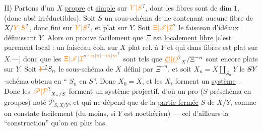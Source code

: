 II) Partons d’un $X$ \uline{propre} et \uline{simple} sur ${\unsure{Y|S}}$, dont les fibres sont de dim $1$,  {} (donc abs! irréductibles). Soit $S$ un sous-schéma  de  ne contenant aucune fibre de $X/{\unsure{Y|S}}$, donc \uline{fini} sur ${\unsure{Y|S}}$, et plat sur $Y$. Soit ${\unsure{\Xi|\mathscr I|\mathcal I}}$ le faisceau d’idéaux définissant $Y$. Alors on prouve facilement que $\Xi$ est \uline{localement libre} [c’est purement local : un faisceau coh. sur $X$ plat rel. à $Y$ et qui {} dans fibres  est plat sur $X$.---]
donc    {} que les ${\unsure{\Xi|\mathscr I|\mathcal I}}^{{\unsure{-n|n|-m|m}}}$ sont tels que ${\unsure{\underline{\mathcal O}|\underline O}}_X/\Xi^{-n}$ sont encore plats sur $Y$. Soit $\deleted{{\unsure{Y}}}S_n$ le sous-schéma de $X$ défini par $\Xi^{-n}$, et soit $X_n=X\amalg_{S_n}Y$ le $\deleted{S}Y$-schéma obtenu en ``{} $S_n$ en $S$''.
  Donc $X_0=X$, et les $X_i$ forment un \uline{système} \uline{}.
Donc les ${\unsure{\mathscr P|\mathcal P}}_{X_n/S}$ forment un système  projectif, d’où un pro-($S$-préschéma en groupes) noté $\mathscr P_{S,X/Y}$, et qui ne dépend que de la \uline{partie fermée} $S$ de $X/Y$, comme on constate facilement (du moins, si $Y$ est noethérien) --- cel{} {} d’ailleurs {} la ``construction'' qu’on en {} plus bas.

